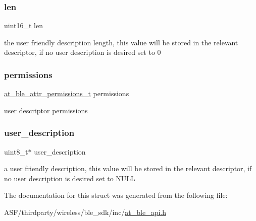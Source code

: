 \subsubsection{\texorpdfstring{len}{len}}
{\footnotesize\ttfamily uint16\+\_\+t len}

the user friendly description length, this value will be stored in the relevant descriptor, if no user description is desired set to 0 \mbox{\label{structat__ble__user__desc__t_a546cd0fa9c3d1a1d7998330c034e6bc8}} 
\subsubsection{\texorpdfstring{permissions}{permissions}}
{\footnotesize\ttfamily \mbox{\hyperlink{at__ble__api_8h_a5d87cd231ea3f9e11846dba7cf75eb61}{at\+\_\+ble\+\_\+attr\+\_\+permissions\+\_\+t}} permissions}

user descriptor permissions \mbox{\label{structat__ble__user__desc__t_a1f32219ae6dcf13bb38efa8631673521}} 
\subsubsection{\texorpdfstring{user\_description}{user\_description}}
{\footnotesize\ttfamily uint8\+\_\+t$\ast$ user\+\_\+description}

a user friendly description, this value will be stored in the relevant descriptor, if no user description is desired set to N\+U\+LL 

The documentation for this struct was generated from the following file\+:\begin{DoxyCompactItemize}
\item 
A\+S\+F/thirdparty/wireless/ble\+\_\+sdk/inc/\mbox{\hyperlink{at__ble__api_8h}{at\+\_\+ble\+\_\+api.\+h}}\end{DoxyCompactItemize}
